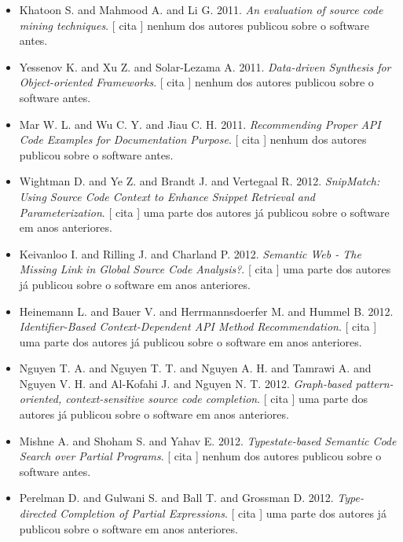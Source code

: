 \begin{itemize}
      [
          cita
      ]
nenhum dos autores publicou sobre o software antes.
\item Khatoon S. and Mahmood A. and Li G.
      2011.
        \textit{ An evaluation of source code mining techniques}.
      [
          cita
      ]
nenhum dos autores publicou sobre o software antes.
\item Yessenov K. and Xu Z. and Solar-Lezama A.
      2011.
        \textit{ Data-driven Synthesis for Object-oriented Frameworks}.
      [
          cita
      ]
nenhum dos autores publicou sobre o software antes.
\item Mar W. L. and Wu C. Y. and Jiau C. H.
      2011.
        \textit{ Recommending Proper API Code Examples for Documentation Purpose}.
      [
          cita
      ]
nenhum dos autores publicou sobre o software antes.
\item Wightman D. and Ye Z. and Brandt J. and Vertegaal R.
      2012.
        \textit{ SnipMatch: Using Source Code Context to Enhance Snippet Retrieval and Parameterization}.
      [
          cita
      ]
uma parte dos autores já publicou sobre o software em anos anteriores.
\item Keivanloo I. and Rilling J. and Charland P.
      2012.
        \textit{ Semantic Web - The Missing Link in Global Source Code Analysis?}.
      [
          cita
      ]
uma parte dos autores já publicou sobre o software em anos anteriores.
\item Heinemann L. and Bauer V. and Herrmannsdoerfer M. and Hummel B.
      2012.
        \textit{ Identifier-Based Context-Dependent API Method Recommendation}.
      [
          cita
      ]
uma parte dos autores já publicou sobre o software em anos anteriores.
\item Nguyen T. A. and Nguyen T. T. and Nguyen A. H. and Tamrawi A. and Nguyen V. H. and Al-Kofahi J. and Nguyen N. T.
      2012.
        \textit{ Graph-based pattern-oriented, context-sensitive source code completion}.
      [
          cita
      ]
uma parte dos autores já publicou sobre o software em anos anteriores.
\item Mishne A. and Shoham S. and Yahav E.
      2012.
        \textit{ Typestate-based Semantic Code Search over Partial Programs}.
      [
          cita
      ]
nenhum dos autores publicou sobre o software antes.
\item Perelman D. and Gulwani S. and Ball T. and Grossman D.
      2012.
        \textit{ Type-directed Completion of Partial Expressions}.
      [
          cita
      ]
uma parte dos autores já publicou sobre o software em anos anteriores.

\end{itemize}
